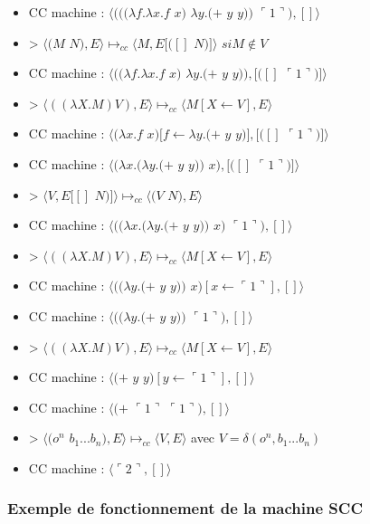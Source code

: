 \documentclass[10pt,a4paper]{article}
\begin{document}
				\begin{itemize}
					\item[] CC machine : $\langle(((\lambda f.\lambda x.f$ $x)$ $\lambda y.(+$ $y$ $y))$ $\ulcorner 1\urcorner),[]\rangle$
					\item[] > $\langle(M$ $N),E\rangle \longmapsto_{cc} \langle M,E[([]$ $N)]\rangle$ $si M \notin V$
					\item[] CC machine : $\langle((\lambda f.\lambda x.f$ $x)$ $\lambda y.(+$ $y$ $y)),[([]$ $\ulcorner 1\urcorner)]\rangle$
					\item[] > $\langle((\lambda X.M) V),E\rangle \longmapsto_{cc} \langle M[X\longleftarrow V],E\rangle$
					\item[] CC machine : $\langle(\lambda x.f$ $x)[f \leftarrow \lambda y.(+$ $y$ $y)],[([]$ $\ulcorner 1\urcorner)]\rangle$
					\item[] CC machine : $\langle(\lambda x.(\lambda y.(+$ $y$ $y))$ $x),[([]$ $\ulcorner 1\urcorner)]\rangle$
					\item[] > $\langle V,E[[]$ $N)]\rangle \longmapsto_{cc} \langle(V$ $N),E\rangle$ 
					\item[] CC machine : $\langle((\lambda x.(\lambda y.(+$ $y$ $y))$ $x)$ $\ulcorner 1\urcorner),[]\rangle$
					\item[] > $\langle((\lambda X.M) V),E\rangle \longmapsto_{cc} \langle M[X\longleftarrow V],E\rangle$
					\item[] CC machine : $\langle((\lambda y.(+$ $y$ $y))$ $x)[x \leftarrow \ulcorner 1\urcorner],[]\rangle$
					\item[] CC machine : $\langle((\lambda y.(+$ $y$ $y))$ $\ulcorner 1\urcorner),[]\rangle$
					\item[] > $\langle((\lambda X.M) V),E\rangle \longmapsto_{cc} \langle M[X\longleftarrow V],E\rangle$
					\item[] CC machine : $\langle(+$ $y$ $y)[y \leftarrow \ulcorner 1\urcorner],[]\rangle$
					\item[] CC machine : $\langle(+$ $\ulcorner 1\urcorner$ $\ulcorner 1\urcorner),[]\rangle$
					\item[] > $\langle(o^{n}$ $b_{1}...b_{n}),E\rangle \longmapsto_{cc}  \langle V,E\rangle$ avec $V = \delta(o^{n},b_{1}...b_{n})$
					\item[] CC machine : $\langle\ulcorner 2\urcorner,[]\rangle$
				\end{itemize}
				
			\subsubsection{Exemple de fonctionnement de la machine SCC}\label{SCC}
				
\end{document}
